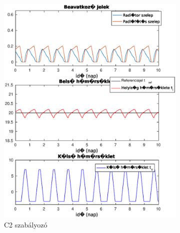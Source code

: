 \begin{figure}[H]
\begin{subfigure}[t]{0.32\textwidth}
		\includegraphics[trim=0 0 0 0, clip,width=\textwidth]{figures/onlab/constRefPrev/C2constref}
		\caption{C2 szabályozó}
		\label{fig:mpc-wy-2}
	\end{subfigure}
	~
	\begin{subfigure}[t]{0.32\textwidth}
		\centering

\end{subfigure}
\end{figure}
